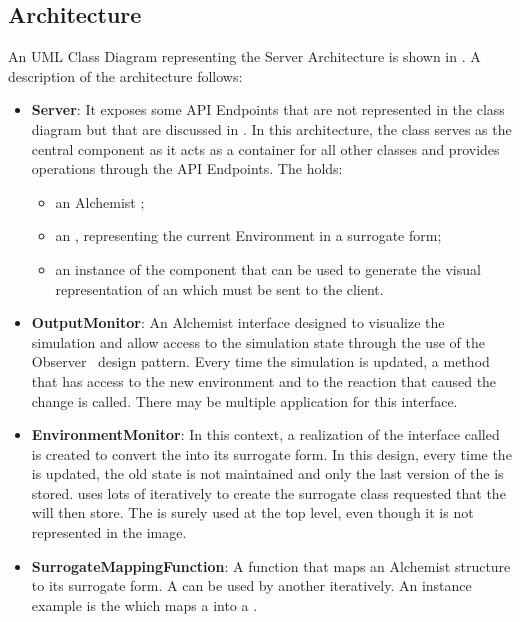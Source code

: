 \subsection{Architecture}
\label{ssec:architecture}
An UML Class Diagram representing the Server Architecture is shown in . A description of the architecture follows:


\begin{itemize}
	\item \textbf{Server}: It exposes some API Endpoints that are not represented in the class diagram but that are discussed in . In this architecture, the  class serves as the central component as it acts as a container for all other classes and provides operations through the API Endpoints. The  holds:
	\begin{itemize}
		\item an Alchemist ;
		\item an , representing the current Environment in a surrogate form;
		\item an instance of the  component that can be used to generate the visual representation of an  which must be sent to the client.
	\end{itemize}
	\item \textbf{OutputMonitor}: An Alchemist interface designed to visualize the simulation and allow access to the simulation state through the use of the Observer~\cite{design-patterns} design pattern. Every time the simulation is updated, a method that has access to the new environment and to the reaction that caused the change is called. There may be multiple application for this interface.
	\item \textbf{EnvironmentMonitor}: In this context, a realization of the  interface called  is created to convert the  into its surrogate form. In this design, every time the  is updated, the old state is not maintained and only the last version of the  is stored.   uses lots of  iteratively to create the surrogate class requested that the  will then store. The  is surely used at the top level, even though it is not represented in the image.
	\item \textbf{SurrogateMappingFunction}: A function that maps an Alchemist structure to its surrogate form. A  can be used by another  iteratively. An instance example is the  which maps a  into a .
\end{itemize}

